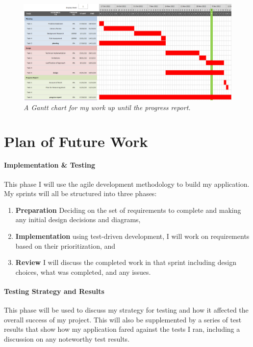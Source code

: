 \begin{figure}[ht]
  \includegraphics[width=\textwidth]{diagrams/gantt-chart-1.png}\vspace{-4mm}
  \caption{\textit{A Gantt chart for my work up until the progress report.}}
\end{figure}

\section{Plan of Future Work}

\paragraph{Implementation \& Testing}
This phase I will use the agile development methodology to build my application. My sprints will all be structured into three phases:

\begin{enumerate}
  \item \textbf{Preparation} Deciding on the set of requirements to complete and making any initial design decisions and diagrams,
  \item \textbf{Implementation} using test-driven development, I will work on requirements based on their prioritization, and
  \item \textbf{Review} I will discuss the completed work in that sprint including design choices, what was completed, and any issues.  
\end{enumerate}

\paragraph{Testing Strategy and Results}
This phase will be used to discuss my strategy for testing and how it affected the overall success of my project. This will also be supplemented by a series of test results that show how my application fared against the tests I ran, including a discussion on any noteworthy test results. 

